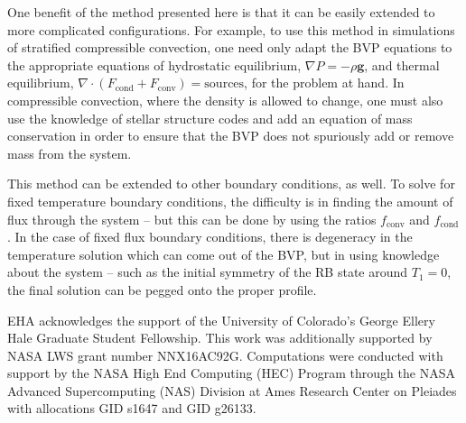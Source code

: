\documentclass[aps, pre, onecolumn, nofootinbib, notitlepage, groupedaddress, amsfonts, amssymb, amsmath, longbibliography]{revtex4-1}
\newcommand{\Div}[1]{\ensuremath{\nabla\cdot\left( #1\right)}}
\newcommand{\grad}{\ensuremath{\nabla}}
\begin{document}
One benefit of the method presented here is that it can be easily extended to more complicated
configurations.  For example, to use this method in simulations of stratified compressible convection,
one need only adapt the BVP equations to the appropriate equations of hydrostatic equilibrium,
$\grad P = -\rho \bm{g}$, and thermal equilibrium, $\Div{F_{\text{cond}} + F_{\text{conv}}} = \text{sources}$,
for the problem at hand.  In compressible convection, where the density is allowed to change,
one must also use the knowledge of stellar structure codes and add an equation of mass conservation
in order to ensure that the BVP does not spuriously add or remove mass from the system.

This method can be extended to other boundary conditions, as well.  To solve for fixed temperature
boundary conditions, the difficulty is in finding the amount of flux through the system -- but
this can be done by using the ratios $f_{\text{conv}}$ and $f_{\text{cond}}$.  In the case of
fixed flux boundary conditions, there is degeneracy in the temperature solution which can come
out of the BVP, but in using knowledge about the system -- such as the initial symmetry of the
RB state around $T_1 = 0$, the final solution can be pegged onto the proper profile.




\begin{acknowledgments}
EHA acknowledges the support of the University of Colorado's George 
Ellery Hale Graduate Student Fellowship.
This work was additionally supported by  NASA LWS grant number NNX16AC92G.  
Computations were conducted 
with support by the NASA High End Computing (HEC) Program through the NASA 
Advanced Supercomputing (NAS) Division at Ames Research Center on Pleiades
with allocations GID s1647 and GID g26133.
\end{acknowledgments}


\appendix
\end{document}
